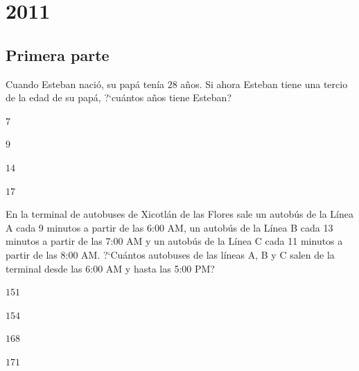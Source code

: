 \chapter{2011}
\label{cha:2011}

\section{Primera parte}
\label{sec:primera-parte}

\begin{Problema}{1}
  Cuando Esteban naci\'o, su pap\'a ten\'ia $28$ a\~nos. Si ahora
  Esteban tiene una tercio de la edad de su pap\'a, ?`cu\'antos a\~nos
  tiene Esteban?

  \begin{inparaenum}
  \item $7$ \esp
  \item $9$ \esp
  \item $14$ \esp
  \item $17$ \esp
  \item \nota
  \end{inparaenum}
\end{Problema}

\begin{Solucion}
  
\end{Solucion}

\begin{Problema}{2}
  En la terminal de autobuses de Xicotl\'an de las Flores sale un
  autob\'us de la L\'inea A cada 9 minutos a partir de las 6:00 AM, un
  autob\'us de la L\'inea B cada 13 minutos a partir de las 7:00 AM y
  un autob\'us de la L\'inea C cada 11 minutos a partir de las 8:00
  AM. ?`Cu\'antos autobuses de las l\'ineas A, B y C salen de la
  terminal desde las 6:00 AM y hasta las 5:00 PM?

  \begin{inparaenum}
  \item $151 $ \esp
  \item $154$ \esp
  \item $168 $ \esp
  \item $171$ \esp
  \item \nota
  \end{inparaenum}
\end{Problema}

\begin{Solucion}
  
\end{Solucion}

